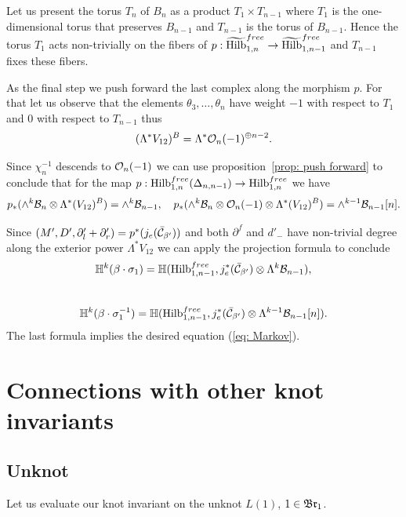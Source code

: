 \documentclass[10pt]{amsart}
\begin{document}
Let us present the torus $T_n$ of $B_n$ as a product $T_1\times T_{n-1}$ where $T_1$ is the one-dimensional torus that preserves $B_{n-1}$ and  $T_{n-1}$ is the torus of $B_{n-1}$.
Hence the torus $T_1$  acts non-trivially on the fibers of $p:\widetilde{\mathrm{Hilb}}_{1,n}^{free}\to \widetilde{\mathrm{Hilb}}_{1,n-1}^{free}$ and $T_{n-1}$ fixes these fibers.

As the final step we push forward the last complex along the morphism $p$.
 For that let us observe that the elements $\theta_3,\dots,\theta_n$ have weight $-1$ with respect to $T_1$ and $0$ with respect to $T_{n-1}$ thus
 $$ (\Lambda^* V_{12})^B=\Lambda^* \mathcal{O}_n(-1)^{\oplus n-2}.$$



Since $\chi_n^{-1}$ descends to $\mathcal{O}_n(-1)$ we can use proposition~\ref{prop: push forward} to conclude that for the map $p:\mathrm{Hilb}^{free}_{1,n}(\Delta_{n,n-1})\to \mathrm{Hilb}^{free}_{1,n}$ we have
$$ p_*(\wedge^k\mathcal{B}_n\otimes\Lambda^*(V_{12})^B)=\wedge^k\mathcal{B}_{n-1},\quad  p_*(\wedge^k\mathcal{B}_n\otimes \mathcal{O}_n(-1)\otimes \Lambda^*(V_{12})^B)=\wedge^{k-1}\mathcal{B}_{n-1}[n].$$

Since $(M',D',\partial'_l+\partial'_r)=p^*(j_{e}(\bar{\mathcal{C}}_{\beta'}))$ and both $\partial^f$ and $d'_-$ have non-trivial degree along the exterior power
$\Lambda^* V_{12}$  we can apply the projection formula to conclude
\[ \mathbb{H}^k(\beta\cdot\sigma_{1})=\mathbb{H}(\mathrm{Hilb}^{free}_{1,n-1}, j^*_e(\bar{\mathcal{C}}_{\beta'})\otimes \Lambda^k\mathcal{B}_{n-1}),\]\
\[\mathbb{H}^k(\beta\cdot\sigma_{1}^{-1})=\mathbb{H}(\mathrm{Hilb}^{free}_{1,n-1}, j^*_e(\bar{\mathcal{C}}_{\beta'})\otimes \Lambda^{k-1}\mathcal{B}_{n-1}[n]).\]
 The last formula  implies the desired equation (\ref{eq: Markov}).

%

 \section{Connections with other knot invariants}

\subsection{Unknot}
\label{sec:unknot}

Let us evaluate our knot invariant on the unknot \(L(1)\), \(1\in \mathfrak{Br}_1\).
\end{document}
